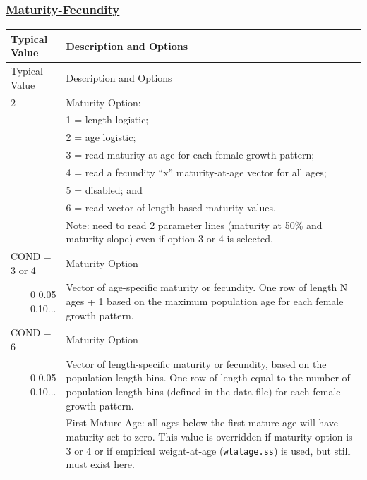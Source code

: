 \hypertarget{Mat-Fec}{}
\subsubsection[Maturity-Fecundity]{\protect\hyperlink{Mat-Fec}{Maturity-Fecundity}}

\begin{longtable}{p{0.5cm} p{2cm} p{13cm}}
	\hline	
	\multicolumn{2}{l}{Typical Value} & Description and Options \Tstrut\Bstrut\\
	\hline
	\endfirsthead

	\hline
	\multicolumn{2}{l}{Typical Value} & Description and Options \Tstrut\Bstrut\\
	\hline
	\endhead
	\hline

	\endfoot
	
	\endlastfoot

	2 & & Maturity Option: \Tstrut\\
	  & & 1 = length logistic; \\
	  & & 2 = age logistic; \\
	  & & 3 = read maturity-at-age for each female growth pattern; \\
	  & & 4 = read a fecundity ``x'' maturity-at-age vector for all ages; \\
	  & & 5 = disabled; and \\
	  & & 6 = read vector of length-based maturity values. \\
	  & & Note: need to read 2 parameter lines (maturity at 50\% and maturity slope) even if option 3 or 4 is selected. \Bstrut\\
	\hline

	\multicolumn{2}{l}{COND = 3 or 4} & Maturity Option \Tstrut\\
	\multicolumn{2}{r}{0 0.05 0.10...} & Vector of age-specific maturity or fecundity. One row of length N ages + 1 based on the maximum population age for each female growth pattern. \Bstrut\\
	\multicolumn{2}{l}{COND = 6} & Maturity Option \Tstrut\\
	\multicolumn{2}{r}{0 0.05 0.10...} & Vector of length-specific maturity or fecundity, based on the population length bins. One row of length equal to the number of population length bins (defined in the data file) for each female growth pattern. \Bstrut\\
	\hline
	
	\Tstrut 1 & & First Mature Age: all ages below the first mature age will have maturity set to zero. This value is overridden if maturity option is 3 or 4 or if empirical weight-at-age (\texttt{wtatage.ss}) is used, but still must exist here. \Bstrut\\
	\hline


\end{longtable}
